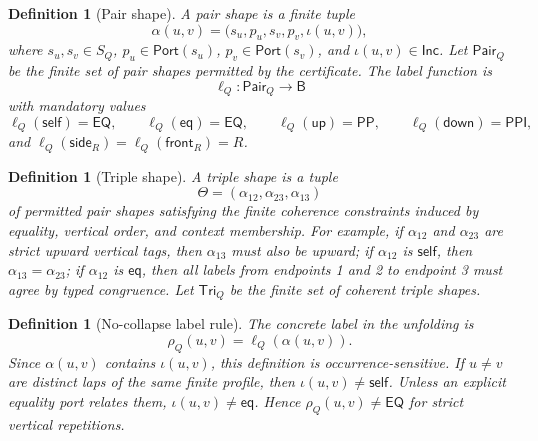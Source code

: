\documentclass[11pt]{article}
\newtheorem{definition}[theorem]{Definition}
\newcommand{\Base}{\mathsf B}
\newcommand{\EQ}{\mathsf{EQ}}
\newcommand{\PP}{\mathsf{PP}}
\newcommand{\PPI}{\mathsf{PPI}}
\newcommand{\Port}{\mathsf{Port}}
\newcommand{\Pair}{\mathsf{Pair}}
\newcommand{\Tri}{\mathsf{Tri}}
\newcommand{\Inc}{\mathsf{Inc}}
\newcommand{\self}{\mathsf{self}}
\newcommand{\eqtag}{\mathsf{eq}}
\newcommand{\up}{\mathsf{up}}
\newcommand{\down}{\mathsf{down}}
\newcommand{\side}{\mathsf{side}}
\newcommand{\front}{\mathsf{front}}
\begin{document}
\begin{definition}[Pair shape]
A pair shape is a finite tuple
\[
  \alpha(u,v)=\bigl(s_u,p_u,s_v,p_v,\iota(u,v)\bigr),
\]
where \(s_u,s_v\in S_Q\), \(p_u\in\Port(s_u)\), \(p_v\in\Port(s_v)\), and \(\iota(u,v)\in\Inc\).  Let \(\Pair_Q\) be the finite set of pair shapes permitted by the certificate.  The label function is
\[
  \ell_Q:\Pair_Q\to\Base
\]
with mandatory values
\[
  \ell_Q(\self)=\EQ,
  \qquad
  \ell_Q(\eqtag)=\EQ,
  \qquad
  \ell_Q(\up)=\PP,
  \qquad
  \ell_Q(\down)=\PPI,
\]
and \(\ell_Q(\side_R)=\ell_Q(\front_R)=R\).
\end{definition}

\begin{definition}[Triple shape]
A triple shape is a tuple
\[
  \Theta=(\alpha_{12},\alpha_{23},\alpha_{13})
\]
of permitted pair shapes satisfying the finite coherence constraints induced by equality, vertical order, and context membership.  For example, if \(\alpha_{12}\) and \(\alpha_{23}\) are strict upward vertical tags, then \(\alpha_{13}\) must also be upward; if \(\alpha_{12}\) is \(\self\), then \(\alpha_{13}=\alpha_{23}\); if \(\alpha_{12}\) is \(\eqtag\), then all labels from endpoints 1 and 2 to endpoint 3 must agree by typed congruence.  Let \(\Tri_Q\) be the finite set of coherent triple shapes.
\end{definition}

\begin{definition}[No-collapse label rule]\label{def:no-collapse}
The concrete label in the unfolding is
\[
  \rho_Q(u,v)=\ell_Q(\alpha(u,v)).
\]
Since \(\alpha(u,v)\) contains \(\iota(u,v)\), this definition is occurrence-sensitive.  If \(u\ne v\) are distinct laps of the same finite profile, then \(\iota(u,v)\ne\self\).  Unless an explicit equality port relates them, \(\iota(u,v)\ne\eqtag\).  Hence \(\rho_Q(u,v)\ne\EQ\) for strict vertical repetitions.
\end{definition}
\end{document}
